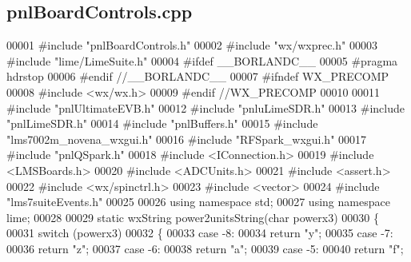 \subsection{pnl\+Board\+Controls.\+cpp}
\label{pnlBoardControls_8cpp_source}

\begin{DoxyCode}
00001 \textcolor{preprocessor}{#include "pnlBoardControls.h"}
00002 \textcolor{preprocessor}{#include "wx/wxprec.h"}
00003 \textcolor{preprocessor}{#include "lime/LimeSuite.h"}
00004 \textcolor{preprocessor}{#ifdef \_\_BORLANDC\_\_}
00005 \textcolor{preprocessor}{#pragma hdrstop}
00006 \textcolor{preprocessor}{#endif //\_\_BORLANDC\_\_}
00007 \textcolor{preprocessor}{#ifndef WX\_PRECOMP}
00008 \textcolor{preprocessor}{#include <wx/wx.h>}
00009 \textcolor{preprocessor}{#endif //WX\_PRECOMP}
00010 
00011 \textcolor{preprocessor}{#include "pnlUltimateEVB.h"}
00012 \textcolor{preprocessor}{#include "pnluLimeSDR.h"}
00013 \textcolor{preprocessor}{#include "pnlLimeSDR.h"}
00014 \textcolor{preprocessor}{#include "pnlBuffers.h"}
00015 \textcolor{preprocessor}{#include "lms7002m_novena_wxgui.h"}
00016 \textcolor{preprocessor}{#include "RFSpark_wxgui.h"}
00017 \textcolor{preprocessor}{ #include "pnlQSpark.h"}
00018 \textcolor{preprocessor}{#include <IConnection.h>}
00019 \textcolor{preprocessor}{#include <LMSBoards.h>}
00020 \textcolor{preprocessor}{#include <ADCUnits.h>}
00021 \textcolor{preprocessor}{#include <assert.h>}
00022 \textcolor{preprocessor}{#include <wx/spinctrl.h>}
00023 \textcolor{preprocessor}{#include <vector>}
00024 \textcolor{preprocessor}{#include "lms7suiteEvents.h"}
00025 
00026 \textcolor{keyword}{using namespace }std;
00027 \textcolor{keyword}{using namespace }lime;
00028 
00029 \textcolor{keyword}{static} wxString power2unitsString(\textcolor{keywordtype}{char} powerx3)
00030 \{
00031     \textcolor{keywordflow}{switch} (powerx3)
00032     \{
00033     \textcolor{keywordflow}{case} -8:
00034         \textcolor{keywordflow}{return} \textcolor{stringliteral}{"y"};
00035     \textcolor{keywordflow}{case} -7:
00036         \textcolor{keywordflow}{return} \textcolor{stringliteral}{"z"};
00037     \textcolor{keywordflow}{case} -6:
00038         \textcolor{keywordflow}{return} \textcolor{stringliteral}{"a"};
00039     \textcolor{keywordflow}{case} -5:
00040         \textcolor{keywordflow}{return} \textcolor{stringliteral}{"f"};

\end{DoxyCode}
